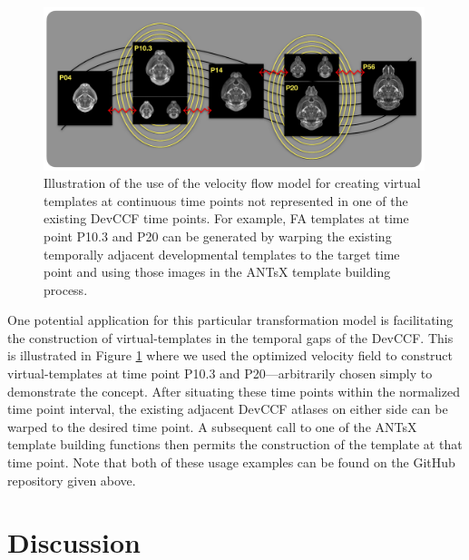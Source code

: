 \documentclass[
  12pt,
]{article}
\begin{document}
\begin{figure}[!htb]
\centering
\includegraphics[width=0.99\textwidth]{Figures/pseudo_template.pdf}
\caption{Illustration of the use of the velocity flow model for creating virtual templates
at continuous time points not represented in one of the existing DevCCF time points.
For example, FA templates at time point P10.3 and P20 can be generated by warping the 
existing temporally adjacent developmental templates to the target time point and using 
those images in the ANTsX template building process.}
\label{fig:virtual}
\end{figure}

One potential application for this particular transformation model is
facilitating the construction of virtual-templates in the temporal gaps
of the DevCCF. This is illustrated in Figure \ref{fig:virtual} where we
used the optimized velocity field to construct virtual-templates at time
point P10.3 and P20---arbitrarily chosen simply to demonstrate the
concept. After situating these time points within the normalized time
point interval, the existing adjacent DevCCF atlases on either side can
be warped to the desired time point. A subsequent call to one of the
ANTsX template building functions then permits the construction of the
template at that time point. Note that both of these usage examples can
be found on the GitHub repository given above.

\clearpage
\newpage

\hypertarget{discussion}{%
\section*{Discussion}\label{discussion}}
\end{document}
